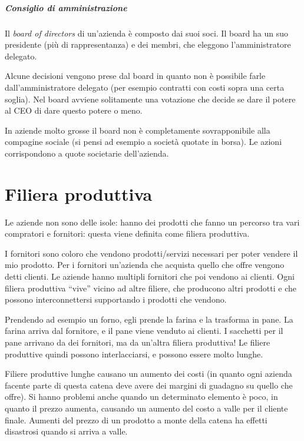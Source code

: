 \paragraph*{Consiglio di amministrazione} Il \textit{board of directors} di
un'azienda è composto dai suoi soci. Il board ha un suo presidente (più di
rappresentanza) e dei membri, che eleggono l'amministratore delegato.

Alcune decisioni vengono prese dal board in quanto non è possibile farle
dall'amministratore delegato (per esempio contratti con costi sopra una certa
soglia). Nel board avviene solitamente una votazione che decide se dare il
potere al CEO di dare questo potere o meno.

In aziende molto grosse il board non è completamente sovrapponibile alla
compagine sociale (si pensi ad esempio a società quotate in borsa). Le azioni
corrispondono a quote societarie dell'azienda.

\chapter{Filiera produttiva}


Le aziende non sono delle isole: hanno dei prodotti che fanno un percorso tra
vari compratori e fornitori: questa viene definita come filiera produttiva.

I fornitori sono coloro che vendono prodotti/servizi necessari per poter
vendere il mio prodotto. Per i fornitori un'azienda che acquista quello che
offre vengono detti clienti. Le aziende hanno multipli fornitori che poi
vendono ai clienti. Ogni filiera produttiva ``vive'' vicino ad altre filiere,
che producono altri prodotti e che possono interconnettersi supportando i
prodotti che vendono.

Prendendo ad esempio un forno, egli prende la farina e la trasforma in pane. La
farina arriva dal fornitore, e il pane viene venduto ai clienti. I sacchetti
per il pane arrivano da dei fornitori, ma da un'altra filiera produttiva! Le
filiere produttive quindi possono interlacciarsi, e possono essere molto lunghe.

Filiere produttive lunghe causano un aumento dei costi (in quanto ogni azienda
facente parte di questa catena deve avere dei margini di guadagno su quello che
offre). Si hanno problemi anche quando un determinato elemento è poco, in
quanto il prezzo aumenta, causando un aumento del costo a valle per il cliente
finale. Aumenti del prezzo di un prodotto a monte della catena ha effetti
disastrosi quando si arriva a valle.

